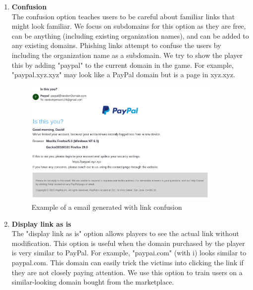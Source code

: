 \begin{enumerate}
          Figure \ref{fig:shortener} shows an example of an email generated with the shortener option. The primary goal of this option is to familiarize players with different URL shortening services and how they can be used to hide actual links. In addition to just knowing how to hide links with shorteners, we want the user to know about different shortening services. Hence, every time the user chooses to hide the link with the shortening service,  we randomly choose one of the shortening services and attach a nano id \footnote{\url{https://github.com/ai/nanoid}} at the end. Table \ref{tab:shortener} shows different link shortener services included in the game with an example.


    \item \textbf{Confusion}\\
          The confusion option teaches users to be careful about familiar links that might look familiar. We focus on subdomains for this option as they are free, can be anything (including existing organization names), and can be added to any existing domains. Phishing links attempt to confuse the users by including the organization name as a subdomain.  We try to show the player this by adding "paypal" to the current domain in the game. For example, "paypal.xyz.xyz" may look like a PayPal domain but is a page in xyz.xyz.

          \begin{figure}[ht]
              \centering
              \includegraphics[width=0.9\textwidth]{figures/section2/confusion.png}
              \caption{Example of a email generated with link confusion}
              \label{fig:confusion}
          \end{figure}

    \item \textbf{Display link as is}\\
          The "display link as is" option allows players to see the actual link without modification. This option is useful when the domain purchased by the player is very similar to PayPal. For example, "paypai.com" (with i) looks similar to paypal.com. This domain can easily trick the victims into clicking the link if they are not closely paying attention. We use this option to train users on a similar-looking domain bought from the marketplace.

\end{enumerate}


